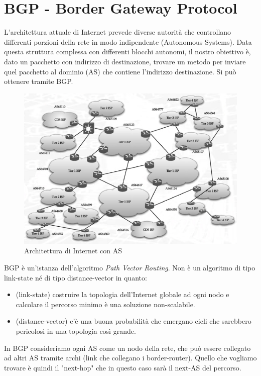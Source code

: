 \documentclass{article}
\begin{document}
\section{BGP - Border Gateway Protocol}
L'architettura attuale di Internet prevede diverse autorità che controllano differenti porzioni della rete in modo indipendente (Autonomous Systems). Data questa struttura complessa con differenti blocchi autonomi, il nostro obiettivo è, dato un pacchetto con indirizzo di destinazione, trovare un metodo per inviare quel pacchetto al dominio (AS) che contiene l'indirizzo destinazione. Si può ottenere tramite BGP.
\begin{figure}[H]
    \centering
    \includegraphics[scale=0.5]{figures/internet_architecture.jpg}
    \caption{Architettura di Internet con AS}
\end{figure}
\noindent BGP è un'istanza dell'algoritmo \textit{Path Vector Routing}. Non è un algoritmo di tipo link-state né di tipo distance-vector in quanto:
\begin{itemize}
    \item (link-state) costruire la topologia dell'Internet globale ad ogni nodo e calcolare il percorso minimo è una soluzione non-scalabile.
    \item (distance-vector) c'è una buona probabilità che emergano cicli che sarebbero pericolosi in una topologia così grande.
\end{itemize}
In BGP consideriamo ogni AS come un nodo della rete, che può essere collegato ad altri AS tramite archi (link che collegano i border-router). Quello che vogliamo trovare è quindi il "next-hop" che in questo caso sarà il next-AS del percorso.\\
\end{document}
